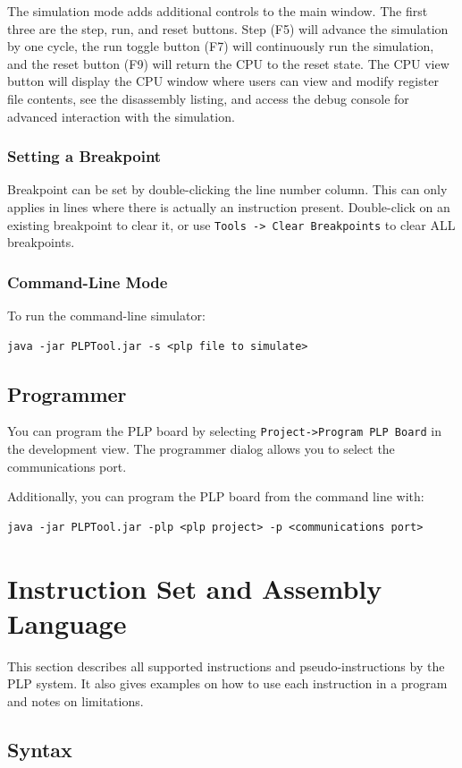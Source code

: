 \documentclass{article}
\begin{document}
The simulation mode adds additional controls to the main window. The first three are the step, run, and reset buttons. Step (F5) will advance the simulation by one cycle, the run toggle button (F7) will continuously run the simulation, and the reset button (F9) will return the CPU to the reset state. The CPU view button will display the CPU window where users can view and modify register file contents, see the disassembly listing, and access the debug console for advanced interaction with the simulation. 
\subsubsection{Setting a Breakpoint}
Breakpoint can be set by double-clicking the line number column. This can only 
applies in lines where there is actually an instruction present. 
Double-click on an existing breakpoint to clear it, or use 
\verb+Tools -> Clear Breakpoints+ to clear ALL breakpoints. 

\subsubsection{Command-Line Mode}
To run the command-line simulator:

\begin{verbatim}
java -jar PLPTool.jar -s <plp file to simulate>
\end{verbatim}
\subsection{Programmer}
You can program the PLP board by selecting 
\verb+Project->Program PLP Board+ 
in the development view. The programmer dialog allows you to select the 
communications port.

Additionally, you can program the PLP board from the command line with:

\begin{verbatim}
java -jar PLPTool.jar -plp <plp project> -p <communications port>
\end{verbatim}
\section{Instruction Set and Assembly Language}
This section describes all supported instructions and pseudo-instructions by the PLP system. It also gives examples on how to use each instruction in a program and notes on limitations. 
\subsection{Syntax}
\end{document}
